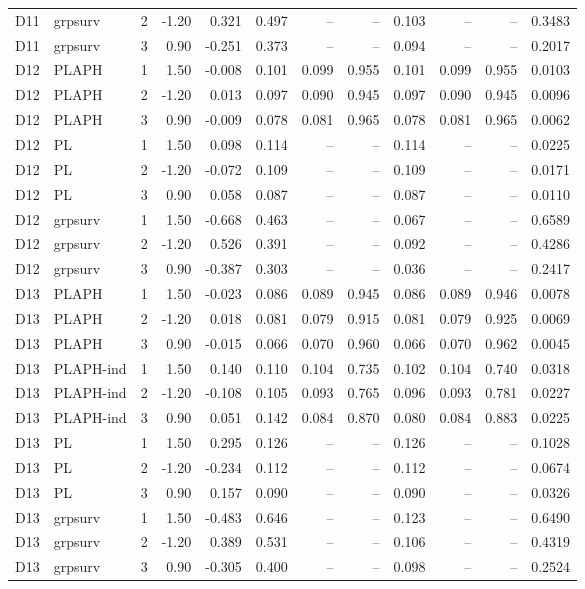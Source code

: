 \begin{longtable}{cllrrrrrrrrr}
D11 & grpsurv & 2 & -1.20 & 0.321 & 0.497 & -- & -- & 0.103 & -- & -- & 0.3483 \\
D11 & grpsurv & 3 & 0.90 & -0.251 & 0.373 & -- & -- & 0.094 & -- & -- & 0.2017 \\
D12 & PLAPH & 1 & 1.50 & -0.008 & 0.101 & 0.099 & 0.955 & 0.101 & 0.099 & 0.955 & 0.0103 \\
D12 & PLAPH & 2 & -1.20 & 0.013 & 0.097 & 0.090 & 0.945 & 0.097 & 0.090 & 0.945 & 0.0096 \\
D12 & PLAPH & 3 & 0.90 & -0.009 & 0.078 & 0.081 & 0.965 & 0.078 & 0.081 & 0.965 & 0.0062 \\
D12 & PL & 1 & 1.50 & 0.098 & 0.114 & -- & -- & 0.114 & -- & -- & 0.0225 \\
D12 & PL & 2 & -1.20 & -0.072 & 0.109 & -- & -- & 0.109 & -- & -- & 0.0171 \\
D12 & PL & 3 & 0.90 & 0.058 & 0.087 & -- & -- & 0.087 & -- & -- & 0.0110 \\
D12 & grpsurv & 1 & 1.50 & -0.668 & 0.463 & -- & -- & 0.067 & -- & -- & 0.6589 \\
D12 & grpsurv & 2 & -1.20 & 0.526 & 0.391 & -- & -- & 0.092 & -- & -- & 0.4286 \\
D12 & grpsurv & 3 & 0.90 & -0.387 & 0.303 & -- & -- & 0.036 & -- & -- & 0.2417 \\
D13 & PLAPH & 1 & 1.50 & -0.023 & 0.086 & 0.089 & 0.945 & 0.086 & 0.089 & 0.946 & 0.0078 \\
D13 & PLAPH & 2 & -1.20 & 0.018 & 0.081 & 0.079 & 0.915 & 0.081 & 0.079 & 0.925 & 0.0069 \\
D13 & PLAPH & 3 & 0.90 & -0.015 & 0.066 & 0.070 & 0.960 & 0.066 & 0.070 & 0.962 & 0.0045 \\
D13 & PLAPH-ind & 1 & 1.50 & 0.140 & 0.110 & 0.104 & 0.735 & 0.102 & 0.104 & 0.740 & 0.0318 \\
D13 & PLAPH-ind & 2 & -1.20 & -0.108 & 0.105 & 0.093 & 0.765 & 0.096 & 0.093 & 0.781 & 0.0227 \\
D13 & PLAPH-ind & 3 & 0.90 & 0.051 & 0.142 & 0.084 & 0.870 & 0.080 & 0.084 & 0.883 & 0.0225 \\
D13 & PL & 1 & 1.50 & 0.295 & 0.126 & -- & -- & 0.126 & -- & -- & 0.1028 \\
D13 & PL & 2 & -1.20 & -0.234 & 0.112 & -- & -- & 0.112 & -- & -- & 0.0674 \\
D13 & PL & 3 & 0.90 & 0.157 & 0.090 & -- & -- & 0.090 & -- & -- & 0.0326 \\
D13 & grpsurv & 1 & 1.50 & -0.483 & 0.646 & -- & -- & 0.123 & -- & -- & 0.6490 \\
D13 & grpsurv & 2 & -1.20 & 0.389 & 0.531 & -- & -- & 0.106 & -- & -- & 0.4319 \\
D13 & grpsurv & 3 & 0.90 & -0.305 & 0.400 & -- & -- & 0.098 & -- & -- & 0.2524 \\
\end{longtable}

